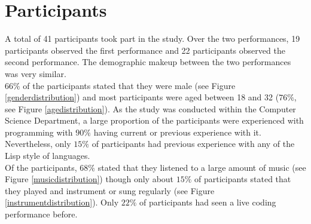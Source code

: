 \documentclass{article}
\begin{document}
\section{Participants}

A total of 41 participants took part in the study. Over the two performances, 19 participants observed the first performance and 22 participants observed the second performance. The demographic makeup between the two performances was very similar.\\

$66\%$ of the participants stated that they were male (see Figure \ref{genderdistribution}) and most participants were aged between 18 and 32 ($76\%$, see Figure \ref{agedistribution}). As the study was conducted within the Computer Science Department, a large proportion of the participants were experienced with programming with $90\%$ having current or previous experience with it. Nevertheless, only $15\%$ of participants had previous experience with any of the Lisp style of languages.\\

Of the participants, $68\%$ stated that they listened to a large amount of music (see Figure \ref{musicdistribution}) though only about $15\%$ of participants stated that they played and instrument or sung regularly (see Figure \ref{instrumentdistribution}). Only $22\%$ of participants had seen a live coding performance before.\\
\end{document}
